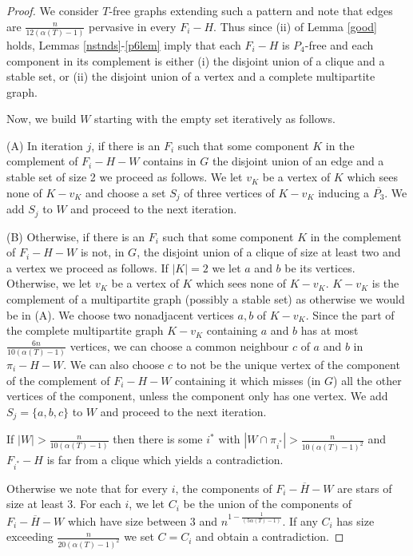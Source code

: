 \documentclass[12pt]{article}
\theoremstyle{definition}
\begin{document}
 \begin{proof}


We consider  $T$-free graphs extending such a pattern  and note that edges are  $\frac{n}{12(\alpha(T)-1)}$  pervasive in every $F_i-H$. 
Thus since (ii) of Lemma \ref{good} holds, Lemmas \ref{nstnds}-\ref{p6lem} imply  that each $F_i-H$ is $P_4$-free and each component in its complement is either (i) the disjoint union of a clique 
 and a stable set, or (ii) the disjoint union of a vertex and a complete multipartite graph. 
 
 Now,  we build $W$  starting with the empty set  iteratively as follows. 
 
 (A) In iteration $j$, if   there is an $F_i$ such that  some  component $K$  in the complement of $F_i-H-W$ contains in $G$  the disjoint union of an edge and a stable set of size 2
  we proceed as follows.  We let $v_K$ be a vertex of $K$ which sees none of 
 $K-v_K$ and choose a set $S_j$ of three vertices of $K-v_K$ inducing a  $\overline{P_3}$. We add $S_j$ to $W$  and proceed to the next iteration. 
 
 (B) Otherwise,  if  there is an $F_i$ such that  some  component $K$  in the complement of $F_i-H-W$ is not,  in $G$, the disjoint 
 union of a clique  of size at least two and a vertex  we proceed as follows.  If $|K|=2$ we let $a$ and $b$ be its vertices. Otherwise, we let $v_K$ be a vertex of $K$ which sees none of 
 $K-v_K$.  $K-v_K$ is  the complement of a multipartite graph (possibly a stable set)  as otherwise we would be in (A).  We  choose two nonadjacent vertices  $a,b$ of $K-v_K$. Since the part of 
 the complete multipartite   graph $K-v_K$ containing $a$ and $b$ has at most  $ \frac{6n}{10(\alpha(T)-1)}$ vertices, we can choose a common neighbour  $c$ of $a$ and $b$
 in $\pi_i-H-W$. We can also choose $c$
 to not be the unique vertex of the component of the complement of $F_i-H-W$   containing it which misses  (in $G$) all the other vertices of the component, unless the component only has  one vertex.  We add $S_j=\{a,b,c\}$ to $W$  and proceed to the next iteration. 
 
  
 If $|W| >\frac{n}{10(\alpha(T)-1)}$ then there is some $i^*$ with $|W \cap\pi_{i^*} | >\frac{n}{10(\alpha(T)-1)^2}$  and $F_{i^*}-H$ is far from a 
 clique which yields a contradiction.  
 
 
 Otherwise we note that for every $i$, the components of $\overline{F_i-H-W}$ are stars of size at least 3. 
 For each $i$, we let $C_i$ be the union of the components of $\overline{F_i-H-W}$ which  have  size  between
$3$ and $n^{1-\frac{1}{(5\alpha(T)-1)}}$. If any $C_i$ has size exceeding $\frac{n}{20(\alpha(T)-1)^2}$ we set $C=C_i$ and obtain a contradiction.


\end{proof}
\end{document}
